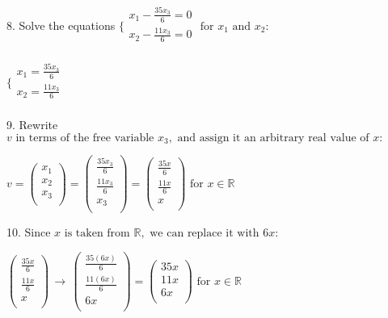 \documentclass{article}
\begin{document}
8. Solve the equations $\{
\begin{array}{l}
x_1-\frac{35 x_3}{6}=0 \\
 x_2-\frac{11 x_3}{6}=0 \\
\end{array}
\text{  for }x_1\text{ and }x_2:$

$\{
\begin{array}{l}
x_1=\frac{35 x_3}{6} \\
 x_2=\frac{11 x_3}{6} \\
\end{array}$

9. Rewrite $v\text{ in terms of the free variable }x_3,\text{ and assign it an arbitrary real value of }x:$

$v=\left(
\begin{array}{c}
x_1 \\
 x_2 \\
 x_3 \\
\end{array}
\right)=\left(
\begin{array}{c}
\frac{35 x_3}{6} \\
 \frac{11 x_3}{6} \\
 x_3 \\
\end{array}
\right)=\left(
\begin{array}{c}
\frac{35 x}{6} \\
 \frac{11 x}{6} \\
 x \\
\end{array}
\right)\text{ for }x\in \mathbb{R}$

10. Since $x\text{ is taken from }\mathbb{R},\text{ we can replace it with }6 x:$

$\left(
\begin{array}{c}
\frac{35 x}{6} \\
 \frac{11 x}{6} \\
 x \\
\end{array}
\right)\, \rightarrow \, \left(
\begin{array}{c}
\frac{35 (6 x)}{6} \\
 \frac{11 (6 x)}{6} \\
 6 x \\
\end{array}
\right)=\left(
\begin{array}{c}
35 x \\
 11 x \\
 6 x \\
\end{array}
\right)\text{ for }x\in \mathbb{R}$
\end{document}

